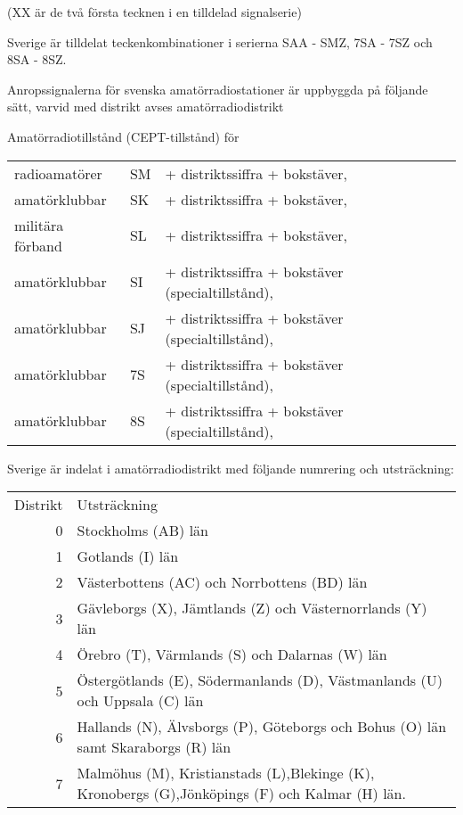 (XX är de två första tecknen i en tilldelad signalserie)

Sverige är tilldelat teckenkombinationer i serierna SAA - SMZ, 7SA - 7SZ och 8SA - 8SZ.

Anropssignalerna för svenska amatörradiostationer är uppbyggda på följande sätt, varvid
med distrikt avses amatörradiodistrikt

Amatörradiotillstånd (CEPT-tillstånd) för
\begin{tabular}{lll}
radioamatörer & SM & + distriktssiffra + bokstäver,  \\
amatörklubbar & SK & + distriktssiffra + bokstäver,  \\
militära förband & SL & + distriktssiffra + bokstäver, \\
amatörklubbar & SI & + distriktssiffra + bokstäver (specialtillstånd), \\
amatörklubbar & SJ & + distriktssiffra + bokstäver (specialtillstånd), \\
amatörklubbar & 7S & + distriktssiffra + bokstäver (specialtillstånd), \\
amatörklubbar & 8S & + distriktssiffra + bokstäver (specialtillstånd), \\
\end{tabular}

Sverige är indelat i amatörradiodistrikt med följande numrering och
utsträckning:

\begin{tabular}{rp{5cm}}
Distrikt & Utsträckning \\
0 & Stockholms (AB) län \\
1 & Gotlands (I) län \\
2 & Västerbottens (AC) och Norrbottens (BD) län \\
3 & Gävleborgs (X), Jämtlands (Z) och Västernorrlands (Y) län \\
4 & Örebro (T), Värmlands (S) och Dalarnas (W) län \\
5 & Östergötlands (E), Södermanlands (D), Västmanlands (U) och Uppsala (C) län\\
6 & Hallands (N), Älvsborgs (P), Göteborgs och Bohus (O) län samt Skaraborgs (R) län \\
7 & Malmöhus (M), Kristianstads (L),Blekinge (K), Kronobergs (G),Jönköpings (F) och Kalmar (H) län.\\
\end{tabular}

